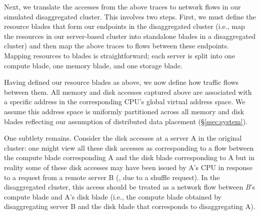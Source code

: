Next, we translate the accesses from the above traces to network flows 
in our simulated disaggregated cluster. 
This involves two steps. 
First, we must define the resource blades that form our endpoints in the disaggregated cluster (i.e., map the resources in our server-based cluster into standalone blades in a disaggregated cluster) and then map the above traces to flows between these endpoints. 
Mapping resources to blades is straightforward; each server is split into one compute blade, one memory blade, and one storage blade.

Having defined our resource blades as above, we now define how traffic 
flows between them. 
All memory and disk accesses captured above are associated with a specific address in the corresponding CPU's global virtual address space. We assume this address space is uniformly partitioned across all memory and disk blades reflecting our assumption of distributed data placement (\S\ref{ssec:system}).  

One subtlety remains. Consider the disk accesses at a server A in the original cluster: one might view all these disk accesses as corresponding to a flow between the compute blade corresponding A and the disk blade corresponding to A but in reality some of these disk accesses may have been issued by A's CPU in response to a request from a remote server B (\eg, due to a shuffle request). 
In the disaggregated cluster, this access should be treated as a network flow between \emph{B}'s compute blade and A's disk blade (i.e., the 
compute blade obtained by disaggregating server B and the disk blade that corresponds to disaggregating A).


